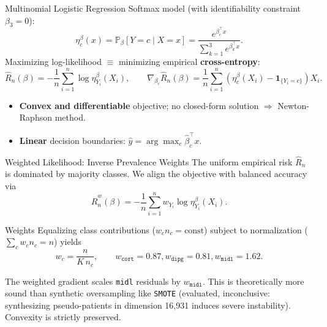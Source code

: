 \documentclass[aspectratio=169, 10pt]{beamer}
\def\quad{ }%
\begin{document}
\begin{frame}{Multinomial Logistic Regression}
  Softmax model (with identifiability constraint $\beta_3 = 0$):
  \[
    \eta_c^\beta(x) = \mathbb{P}_\beta[Y = c \mid X = x] = \frac{e^{\beta_c^\top x}}{\sum_{k=1}^3 e^{\beta_k^\top x}}.
  \]
  Maximizing log-likelihood $\equiv$ minimizing empirical \textbf{cross-entropy}:
  \[
    \hat{R}_n(\beta) = -\frac{1}{n} \sum_{i=1}^n \log \eta_{Y_i}^\beta(X_i), \qquad \nabla_{\beta_c} \hat{R}_n(\beta) = \frac{1}{n} \sum_{i=1}^n \left( \eta_c^\beta(X_i) - \mathbf{1}_{\{Y_i = c\}} \right) X_i.
  \]
  \begin{itemize}
    \item \textbf{Convex and differentiable} objective; no closed-form solution $\Rightarrow$ Newton-Raphson method.
    \item \textbf{Linear} decision boundaries: $\hat{y} = \arg\max_c \hat{\beta}_c^\top x$.
  \end{itemize}
\end{frame}

\begin{frame}{Weighted Likelihood: Inverse Prevalence Weights}
  The uniform empirical risk $\hat{R}_n$ is dominated by majority classes. We align the objective with balanced accuracy via
  \[
    \hat{R}_n^w(\beta) = -\frac{1}{n}\sum_{i=1}^n w_{Y_i} \log \eta_{Y_i}^\beta(X_i).
  \]

  \vspace{5pt}
  \begin{block}{Weights}
    Equalizing class contributions ($w_c n_c = \text{const}$) subject to normalization ($\sum_c w_c n_c = n$) yields
    \[
      w_c = \frac{n}{K\,n_c}, \qquad w_{\texttt{cort}} = 0.87, \quad w_{\texttt{dipg}} = 0.81, \quad w_{\texttt{midl}} = 1.62.
    \]
  \end{block}

  \bigskip
  The weighted gradient scales \texttt{midl} residuals by $w_{\texttt{midl}}$. This is theoretically more sound than synthetic oversampling like \texttt{SMOTE} (evaluated, inconclusive: synthesizing pseudo-patients in dimension 16,931 induces severe instability). Convexity is strictly preserved.
\end{frame}
\end{document}
